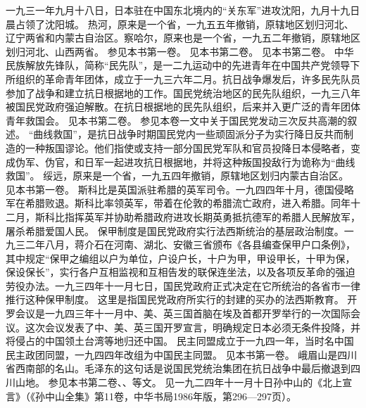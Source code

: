 \begin{maonote}
一九三一年九月十八日，日本驻在中国东北境内的“关东军”进攻沈阳，九月十九日晨占领了沈阳城。
热河，原来是一个省，一九五五年撤销，原辖地区划归河北、辽宁两省和内蒙古自治区。察哈尔，原来也是一个省，一九五二年撤销，原辖地区划归河北、山西两省。
参见本书第一卷。
见本书第二卷。
见本书第二卷。
中华民族解放先锋队，简称“民先队”，是一二九运动中的先进青年在中国共产党领导下所组织的革命青年团体，成立于一九三六年二月。抗日战争爆发后，许多民先队员参加了战争和建立抗日根据地的工作。国民党统治地区的民先队组织，一九三八年被国民党政府强迫解散。在抗日根据地的民先队组织，后来并入更广泛的青年团体青年救国会。
见本书第二卷。
参见本卷一文中关于国民党发动三次反共高潮的叙述。
“曲线救国”，是抗日战争时期国民党内一些顽固派分子为实行降日反共而制造的一种叛国谬论。他们指使或支持一部分国民党军队和官员投降日本侵略者，变成伪军、伪官，和日军一起进攻抗日根据地，并将这种叛国投敌行为诡称为“曲线救国”。
绥远，原来是一个省，一九五四年撤销，原辖地区划归内蒙古自治区。
见本书第一卷。
斯科比是英国派驻希腊的英军司令。一九四四年十月，德国侵略军在希腊败退。斯科比率领英军，带着在伦敦的希腊流亡政府，进入希腊。同年十二月，斯科比指挥英军并协助希腊政府进攻长期英勇抵抗德军的希腊人民解放军，屠杀希腊爱国人民。
保甲制度是国民党政府实行法西斯统治的基层政治制度。一九三二年八月，蒋介石在河南、湖北、安徽三省颁布《各县编查保甲户口条例》，其中规定“保甲之编组以户为单位，户设户长，十户为甲，甲设甲长，十甲为保，保设保长”，实行各户互相监视和互相告发的联保连坐法，以及各项反革命的强迫劳役办法。一九三四年十一月七日，国民党政府正式决定在它所统治的各省市一律推行这种保甲制度。
这里是指国民党政府所实行的封建的买办的法西斯教育。
开罗会议是一九四三年十一月中、美、英三国首脑在埃及首都开罗举行的一次国际会议。这次会议发表了中、美、英三国开罗宣言，明确规定日本必须无条件投降，并将侵占的中国领土台湾等地归还中国。
民主同盟成立于一九四一年，当时名中国民主政团同盟，一九四四年改组为中国民主同盟。
见本书第一卷。
峨眉山是四川省西南部的名山。毛泽东的这句话是说国民党统治集团在抗日战争中最后撤退到四川山地。
参见本书第二卷、、等文。
见一九二四年十一月十日孙中山的《北上宣言》（《孙中山全集》第11卷，中华书局1986年版，第296—297页）。

\end{maonote}
